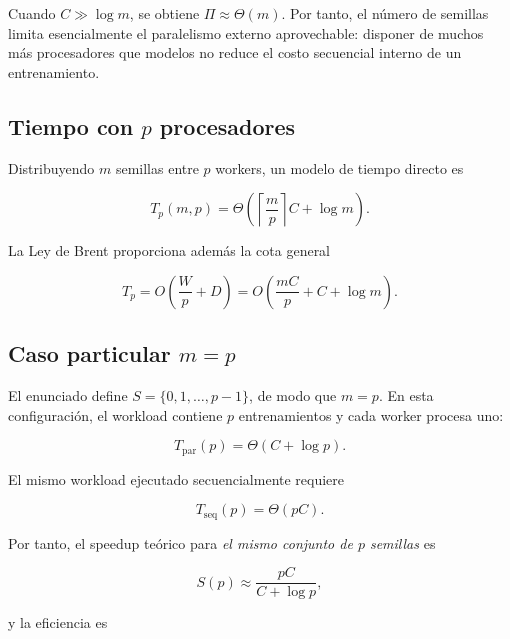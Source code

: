 \documentclass[11pt,a4paper]{article}
\newcommand{\Tpar}{T_p}
\newcommand{\Work}{W}
\newcommand{\Depth}{D}
\newcommand{\Speedup}{S}
\newcommand{\Cost}{C}
\begin{document}
Cuando $\Cost\gg\log m$, se obtiene $\Pi\approx\Theta(m)$. Por tanto, el número de
semillas limita esencialmente el paralelismo externo aprovechable: disponer de muchos
más procesadores que modelos no reduce el costo secuencial interno de un entrenamiento.

\subsection{Tiempo con $p$ procesadores}

Distribuyendo $m$ semillas entre $p$ workers, un modelo de tiempo directo es

\begin{equation}
    \Tpar(m,p)=\Theta\left(\left\lceil\frac{m}{p}\right\rceil\Cost+\log m\right).
    \label{eq:tp-directo}
\end{equation}

La Ley de Brent proporciona además la cota general

\begin{equation}
    \Tpar=O\left(\frac{\Work}{p}+\Depth\right)
    =O\left(\frac{m\Cost}{p}+\Cost+\log m\right).
    \label{eq:brent}
\end{equation}

\subsection{Caso particular $m=p$}

El enunciado define $S=\{0,1,\ldots,p-1\}$, de modo que $m=p$. En esta configuración,
el workload contiene $p$ entrenamientos y cada worker procesa uno:

\begin{equation}
    T_{\mathrm{par}}(p)=\Theta(\Cost+\log p).
    \label{eq:tpar-mp}
\end{equation}

El mismo workload ejecutado secuencialmente requiere

\begin{equation}
    T_{\mathrm{seq}}(p)=\Theta(p\Cost).
    \label{eq:tseq-mp}
\end{equation}

Por tanto, el speedup teórico para \emph{el mismo conjunto de $p$ semillas} es

\begin{equation}
    \Speedup(p)
    \approx\frac{p\Cost}{\Cost+\log p},
    \label{eq:speedup}
\end{equation}

y la eficiencia es
\end{document}
